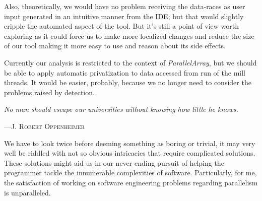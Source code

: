 Also, theoretically, we would have no problem receiving the data-races as user
input generated in an intuitive manner from the IDE; but that would slightly
cripple the automated aspect of the tool. But it's still a point of view worth
exploring as it could force us to make more localized changes and reduce the
size of our tool making it more easy to use and reason about its side effects.

Currently our analysis is restricted to the context of \emph{ParallelArray},
but we should be able to apply automatic privatization to data accessed from
run of the mill threads. It would be easier, probably, because we no longer need
to consider the problems raised by \slcd detection.

\epigraph{\textit{No man should escape our universities without knowing how
little he knows.}}%
{---\textsc{J. Robert Oppenheimer}} 

We have to look twice before deeming something as boring or trivial, it may very
well be riddled with not so obvious intricacies that require complicated
solutions. These solutions might aid us in our never-ending pursuit of helping
the programmer tackle the innumerable complexities of software. Particularly, for
me, the satisfaction of working on software engineering problems regarding
parallelism is unparalleled.
